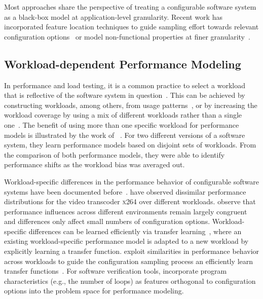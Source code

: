 Most approaches share the perspective of treating a configurable software system as a black-box model at application-level granularity. Recent work has incorporated feature location techniques to guide sampling effort towards relevant configuration options~\cite{velez_2020_configcrusher_jase,velez_comprex_2021} or model non-functional properties at finer granularity~\cite{weber_white_2021}.

\subsection{Workload-dependent Performance Modeling}

In performance and load testing, it is a common practice to select a workload that is reflective of the software system in question~\cite{ceesay2020,papadopoulos2021}. This can be achieved by constructing workloads, among others, from usage patterns~\cite{calzarossa2016}, or by increasing the workload coverage by using a mix of different workloads rather than a single one~\cite{jiang2015survey}.
The benefit of using more than one specific workload for performance models is illustrated by the work of \citeauthor{liao_2020_using_emse}~\cite{liao_2020_using_emse}. For two different versions of a software system, they learn performance models based on disjoint sets of workloads. From the comparison of both performance models, they were able to identify performance shifts as the workload bias was averaged out.

Workload-specific differences in the performance behavior of configurable software systems have been documented before~\cite{jamishidi_transfer_2017,alves_sampling_2020}. \citeauthor{alves_sampling_2020} have observed dissimilar performance distributions for the video transcoder \textsc{x264} over different  workloads. \citeauthor{jamishidi_transfer_2017} observe that performance influences across different environments remain largely congruent and differences only affect small numbers of configuration options. Workload-specific differences can be learned efficiently via transfer learning~\cite{jamishidi_transfer_2017,jamshidi_transfer_gp_2017,ding_bayesian_2020}, where an existing workload-specific performance model is adapted to a new workload by explicitly learning a transfer function. \citeauthor{jamshidi_learning_2018} exploit similarities in performance behavior across workloads to guide the configuration sampling process an efficiently learn transfer functions~\cite{jamshidi_learning_2018}. {\color{purple} For software verification tools, \citeauthor{koc_satune_2021} incorporate program characteristics (e.g., the number of loops) as features orthogonal to configuration options into the problem space for performance modeling.}


